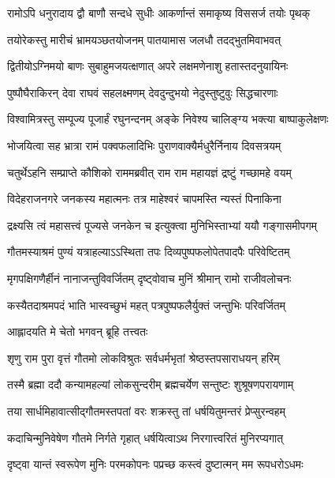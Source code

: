 \twolineshloka
{रामोऽपि धनुरादाय द्वौ बाणौ सन्दधे सुधीः}
{आकर्णान्तं समाकृष्य विससर्ज तयोः पृथक्} %

\twolineshloka
{तयोरेकस्तु मारीचं भ्रामयञ्छतयोजनम्}
{पातयामास जलधौ तदद्भुतमिवाभवत्} %

\twolineshloka
{द्वितीयोऽग्निमयो बाणः सुबाहुमजयत्क्षणात्}
{अपरे लक्षमणेनाशु हतास्तदनुयायिनः} %

\twolineshloka
{पुष्पौघैराकिरन् देवा राघवं सहलक्ष्मणम्}
{देवदुन्दुभयो नेदुस्तुष्टुवुः सिद्धचारणाः} %

\twolineshloka
{विश्वामित्रस्तु सम्पूज्य पूजार्हं रघुनन्दनम्}
{अङ्के निवेश्य चालिङ्ग्य भक्त्या बाष्पाकुलेक्षणः} %

\twolineshloka
{भोजयित्वा सह भ्रात्रा रामं पक्वफलादिभिः}
{पुराणवाक्यैर्मधुरैर्निनाय दिवसत्रयम्} %

\twolineshloka
{चतुर्थेऽहनि सम्प्राप्ते कौशिको राममब्रवीत्}
{राम राम महायज्ञं द्रष्टुं गच्छामहे वयम्} %

\twolineshloka
{विदेहराजनगरे जनकस्य महात्मनः}
{तत्र माहेश्वरं चापमस्ति न्यस्तं पिनाकिना} %

\twolineshloka
{द्रक्ष्यसि त्वं महासत्त्वं पूज्यसे जनकेन च}
{इत्युक्त्वा मुनिभिस्ताभ्यां ययौ गङ्गासमीपगम्} %

\twolineshloka
{गौतमस्याश्रमं पुण्यं यत्राहल्याऽऽस्थिता तपः}
{दिव्यपुष्पफलोपेतपादपैः परिवेष्टितम्} %

\twolineshloka
{मृगपक्षिगणैर्हीनं नानाजन्तुविवर्जितम्}
{दृष्ट्वोवाच मुनिं श्रीमान् रामो राजीवलोचनः} %

\twolineshloka
{कस्यैतदाश्रमपदं भाति भास्वच्छुभं महत्}
{पत्रपुष्पफलैर्युक्तं जन्तुभिः परिवर्जितम्} %

\onelineshloka
{आह्लादयति मे चेतो भगवन् ब्रूहि तत्त्वतः} %


\twolineshloka
{शृणु राम पुरा वृत्तं गौतमो लोकविश्रुतः}
{सर्वधर्मभृतां श्रेष्ठस्तपसाराधयन् हरिम्} %

\twolineshloka
{तस्मै ब्रह्मा ददौ कन्यामहल्यां लोकसुन्दरीम्}
{ब्रह्मचर्येण सन्तुष्टः शुश्रूषणपरायणाम्} %

\twolineshloka
{तया सार्धमिहावात्सीद्गौतमस्तपतां वरः}
{शक्रस्तु तां धर्षयितुमन्तरं प्रेप्सुरन्वहम्} %

\twolineshloka
{कदाचिन्मुनिवेषेण गौतमे निर्गते गृहात्}
{धर्षयित्वाऽथ निरगात्त्वरितं मुनिरप्यगात्} %

\twolineshloka
{दृष्ट्वा यान्तं स्वरूपेण मुनिः परमकोपनः}
{पप्रच्छ कस्त्वं दुष्टात्मन् मम रूपधरोऽधमः} %

